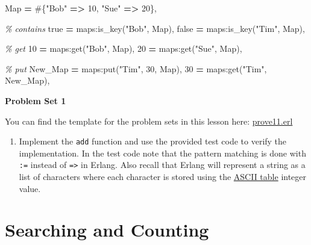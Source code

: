 \documentclass[
]{book}
\newenvironment{Shaded}{\begin{snugshade}}{\end{snugshade}}
\newcommand{\CharTok}[1]{\textcolor[rgb]{0.31,0.60,0.02}{#1}}
\newcommand{\CommentTok}[1]{\textcolor[rgb]{0.56,0.35,0.01}{\textit{#1}}}
\newcommand{\DecValTok}[1]{\textcolor[rgb]{0.00,0.00,0.81}{#1}}
\newcommand{\FunctionTok}[1]{\textcolor[rgb]{0.00,0.00,0.00}{#1}}
\newcommand{\OperatorTok}[1]{\textcolor[rgb]{0.81,0.36,0.00}{\textbf{#1}}}
\newcommand{\StringTok}[1]{\textcolor[rgb]{0.31,0.60,0.02}{#1}}
\newcommand{\VariableTok}[1]{\textcolor[rgb]{0.00,0.00,0.00}{#1}}
\providecommand{\tightlist}{%
  \setlength{\itemsep}{0pt}\setlength{\parskip}{0pt}}
\begin{document}
\begin{Shaded}
\begin{Highlighting}[]
\VariableTok{Map} \OperatorTok{=} \FunctionTok{\#\{}\StringTok{"Bob"} \OperatorTok{=\textgreater{}} \DecValTok{10}\FunctionTok{,} \StringTok{"Sue"} \OperatorTok{=\textgreater{}} \DecValTok{20}\FunctionTok{\},}

\CommentTok{\% contains}
\CharTok{true} \OperatorTok{=} \FunctionTok{maps:is\_key(}\StringTok{"Bob"}\FunctionTok{,} \VariableTok{Map}\FunctionTok{),}
\CharTok{false} \OperatorTok{=} \FunctionTok{maps:is\_key(}\StringTok{"Tim"}\FunctionTok{,} \VariableTok{Map}\FunctionTok{),}

\CommentTok{\% get}
\DecValTok{10} \OperatorTok{=} \FunctionTok{maps:get(}\StringTok{"Bob"}\FunctionTok{,} \VariableTok{Map}\FunctionTok{),}
\DecValTok{20} \OperatorTok{=} \FunctionTok{maps:get(}\StringTok{"Sue"}\FunctionTok{,} \VariableTok{Map}\FunctionTok{),}

\CommentTok{\% put}
\VariableTok{New\_Map} \OperatorTok{=} \FunctionTok{maps:put(}\StringTok{"Tim"}\FunctionTok{,} \DecValTok{30}\FunctionTok{,} \VariableTok{Map}\FunctionTok{),}
\DecValTok{30} \OperatorTok{=} \FunctionTok{maps:get(}\StringTok{"Tim"}\FunctionTok{,} \VariableTok{New\_Map}\FunctionTok{),}
\end{Highlighting}
\end{Shaded}

\begin{problembox}

\textbf{Problem Set 1}

You can find the template for the problem sets in this lesson here: \href{proves/prove11.erl}{prove11.erl}

\begin{enumerate}
\def\labelenumi{\arabic{enumi}.}
\tightlist
\item
  Implement the \texttt{add} function and use the provided test code to verify the implementation. In the test code note that the pattern matching is done with \texttt{:=} instead of \texttt{=\textgreater{}} in Erlang. Also recall that Erlang will represent a string as a list of characters where each character is stored using the \href{https://www.asciitable.com/}{ASCII table} integer value.
\end{enumerate}

\end{problembox}

\hypertarget{searching-and-counting}{%
\section{Searching and Counting}\label{searching-and-counting}}
\end{document}

